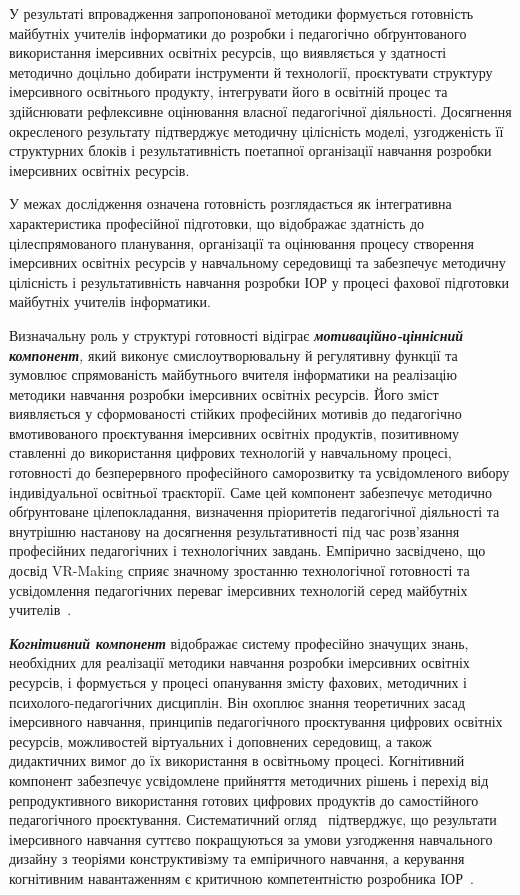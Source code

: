 У результаті впровадження запропонованої методики формується готовність майбутніх учителів інформатики до розробки і педагогічно обґрунтованого використання імерсивних освітніх ресурсів, що виявляється у здатності методично доцільно добирати інструменти й технології, проєктувати структуру імерсивного освітнього продукту, інтегрувати його в освітній процес та здійснювати рефлексивне оцінювання власної педагогічної діяльності. Досягнення окресленого результату підтверджує методичну цілісність моделі, узгодженість її структурних блоків і результативність поетапної організації навчання розробки імерсивних освітніх ресурсів.

У межах дослідження означена готовність розглядається як інтегративна характеристика професійної підготовки, що відображає здатність до цілеспрямованого планування, організації та оцінювання процесу створення імерсивних освітніх ресурсів у навчальному середовищі та забезпечує методичну цілісність і результативність навчання розробки ІОР у процесі фахової підготовки майбутніх учителів інформатики.

Визначальну роль у структурі готовності відіграє \emph{\textbf{мотиваційно-ціннісний компонент},} який виконує смислоутворювальну й регулятивну функції та зумовлює спрямованість майбутнього вчителя інформатики на реалізацію методики навчання розробки імерсивних освітніх ресурсів. Його зміст виявляється у сформованості стійких професійних мотивів до педагогічно вмотивованого проєктування імерсивних освітніх продуктів, позитивному ставленні до використання цифрових технологій у навчальному процесі, готовності до безперервного професійного саморозвитку та усвідомленого вибору індивідуальної освітньої траєкторії. Саме цей компонент забезпечує методично обґрунтоване цілепокладання, визначення пріоритетів педагогічної діяльності та внутрішню настанову на досягнення результативності під час розв'язання професійних педагогічних і технологічних завдань. Емпірично засвідчено, що досвід VR-Making сприяє значному зростанню технологічної готовності та усвідомлення педагогічних переваг імерсивних технологій серед майбутніх учителів~\cite{Lee2022VRMaking}.

\emph{\textbf{Когнітивний компонент}} відображає систему професійно значущих знань, необхідних для реалізації методики навчання розробки імерсивних освітніх ресурсів, і формується у процесі опанування змісту фахових, методичних і психолого-педагогічних дисциплін. Він охоплює знання теоретичних засад імерсивного навчання, принципів педагогічного проєктування цифрових освітніх ресурсів, можливостей віртуальних і доповнених середовищ, а також дидактичних вимог до їх використання в освітньому процесі. Когнітивний компонент забезпечує усвідомлене прийняття методичних рішень і перехід від репродуктивного використання готових цифрових продуктів до самостійного педагогічного проєктування. Систематичний огляд~\cite{Mallek2024SynthesizingVR} підтверджує, що результати імерсивного навчання суттєво покращуються за умови узгодження навчального дизайну з теоріями конструктивізму та емпіричного навчання, а керування когнітивним навантаженням є критичною компетентністю розробника ІОР~\cite{Buchner2021CogLoad}.

